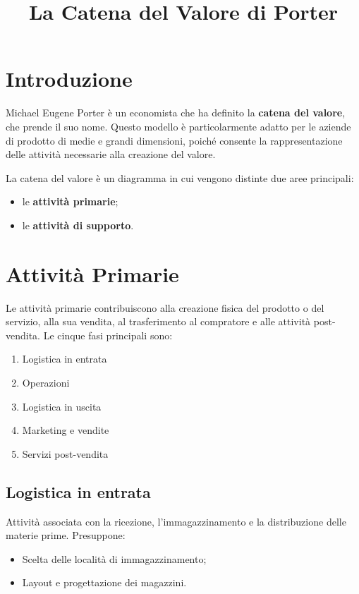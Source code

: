\documentclass[a4paper,12pt]{article}
\title{La Catena del Valore di Porter}
\author{}
\date{}
\begin{document}
\maketitle

\section{Introduzione}
Michael Eugene Porter è un economista che ha definito la \textbf{catena del valore}, che prende il suo nome.  
Questo modello è particolarmente adatto per le aziende di prodotto di medie e grandi dimensioni, poiché consente la rappresentazione delle attività necessarie alla creazione del valore.

La catena del valore è un diagramma in cui vengono distinte due aree principali:
\begin{itemize}
    \item le \textbf{attività primarie};
    \item le \textbf{attività di supporto}.
\end{itemize}

\section{Attività Primarie}
Le attività primarie contribuiscono alla creazione fisica del prodotto o del servizio, alla sua vendita, al trasferimento al compratore e alle attività post-vendita.  
Le cinque fasi principali sono:
\begin{enumerate}
    \item Logistica in entrata
    \item Operazioni
    \item Logistica in uscita
    \item Marketing e vendite
    \item Servizi post-vendita
\end{enumerate}

\subsection{Logistica in entrata}
Attività associata con la ricezione, l’immagazzinamento e la distribuzione delle materie prime.  
Presuppone:
\begin{itemize}
    \item Scelta delle località di immagazzinamento;
    \item Layout e progettazione dei magazzini.
\end{itemize}
\end{document}
